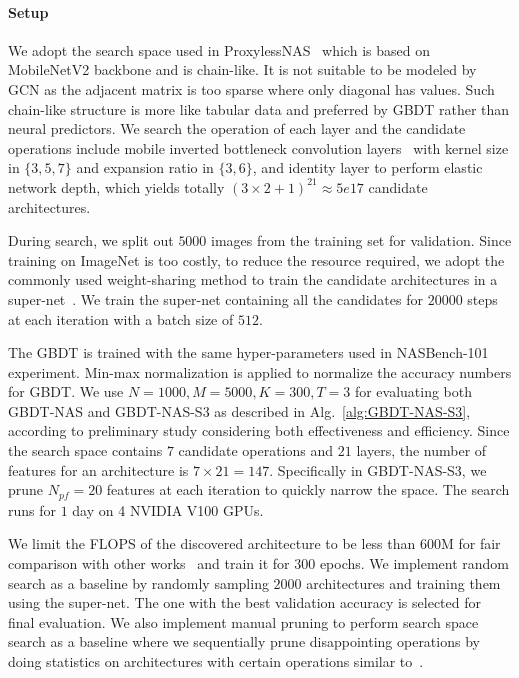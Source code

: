 \documentclass{article}
\begin{document}
\paragraph{Setup}
We adopt the search space used in ProxylessNAS~\cite{proxylessnas} which is based on MobileNetV2 backbone and is chain-like. It is not suitable to be modeled by GCN as the adjacent matrix is too sparse where only diagonal has values. Such chain-like structure is more like tabular data and preferred by GBDT rather than neural predictors. We search the operation of each layer and the candidate operations include mobile inverted bottleneck convolution layers~\cite{mobilenetv2} with kernel size in $\{3, 5, 7\}$ and expansion ratio in $\{3, 6\}$, and identity layer to perform elastic network depth, which yields totally $(3\times2+1)^{21}\approx5e17$ candidate architectures. 

During search, we split out $5000$ images from the training set for validation. Since training on ImageNet is too costly, to reduce the resource required, we adopt the commonly used weight-sharing method to train the candidate architectures in a super-net~\cite{oneshot,onceforall}. We train the super-net containing all the candidates for $20000$ steps at each iteration with a batch size of $512$. 

The GBDT is trained with the same hyper-parameters used in NASBench-101 experiment. Min-max normalization is applied to normalize the accuracy numbers for GBDT. We use $N=1000,M=5000,K=300,T=3$ for evaluating both GBDT-NAS and GBDT-NAS-S3 as described in Alg.~\ref{alg:GBDT-NAS-S3}, according to preliminary study considering both effectiveness and efficiency. Since the search space contains $7$ candidate operations and $21$ layers, the number of features for an architecture is $7\times 21=147$. Specifically in GBDT-NAS-S3, we prune $N_{pf}=20$ features at each iteration to quickly narrow the space. The search runs for $1$ day on 4 NVIDIA V100 GPUs.

We limit the FLOPS of the discovered architecture to be less than $600$M for fair comparison with other works~\cite{nasnet,amoebanet,darts,efficientnet,pcdarts,pdarts} and train it for $300$ epochs. We implement random search as a baseline by randomly sampling $2000$ architectures and training them using the super-net. The one with the best validation accuracy is selected for final evaluation. We also implement manual pruning to perform search space search as a baseline where we sequentially prune disappointing operations by doing statistics on architectures with certain operations similar to~\cite{designspace}.
\end{document}
